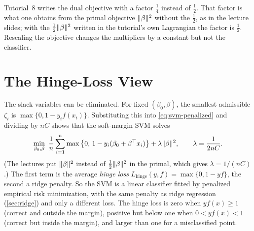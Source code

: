 \begin{remark}
Tutorial~8 writes the dual objective with a factor $\frac14$ instead of $\frac12$. That factor is what one obtains from the primal objective $\lVert \beta\rVert^2$ without the $\frac12$, as in the lecture slides; with the $\frac12\lVert \beta\rVert^2$ written in the tutorial's own Lagrangian the factor is $\frac12$. Rescaling the objective changes the multipliers by a constant but not the classifier.
\end{remark}

\section{The Hinge-Loss View}\label{sec:hinge}

The slack variables can be eliminated. For fixed $(\beta_0,\beta)$, the smallest admissible $\zeta_i$ is $\max\{0,1-y_if(x_i)\}$. Substituting this into \eqref{eq:svm-penalized} and dividing by $nC$ shows that the soft-margin SVM solves
\begin{equation}\label{eq:svm-hinge}
\min_{\beta_0,\beta}\ \frac1n\sum_{i=1}^n\max\big\{0,\,1-y_i(\beta_0+\beta\T x_i)\big\}+\lambda\norm{\beta}^2,\qquad\lambda=\frac1{2nC}.
\end{equation}
(The lectures put $\lVert \beta\rVert^2$ instead of $\frac12\lVert \beta\rVert^2$ in the primal, which gives $\lambda=1/(nC)$.) The first term is the average \emph{hinge loss} $L_{\mathrm{hinge}}(y,f)=\max\{0,1-yf\}$, the second a ridge penalty. So the SVM is a linear classifier fitted by penalized empirical risk minimization, with the same penalty as ridge regression (\cref{sec:ridge}) and only a different loss. The hinge loss is zero when $yf(x)\ge1$ (correct and outside the margin), positive but below one when $0<yf(x)<1$ (correct but inside the margin), and larger than one for a misclassified point.

